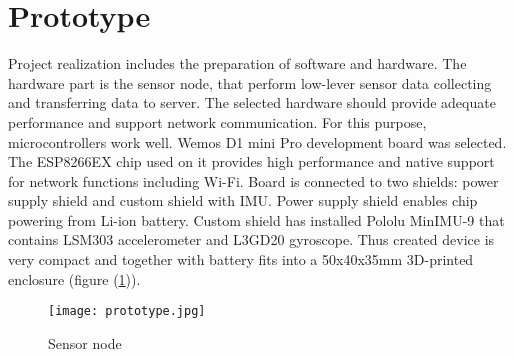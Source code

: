 \section{Prototype}
Project realization includes the preparation of software and hardware. The hardware part is the sensor node, that perform low-lever sensor data collecting and transferring data to server. The selected hardware should provide adequate performance and support network communication. For this purpose, microcontrollers work well. Wemos D1 mini Pro development board was selected. The ESP8266EX chip used on it provides high performance and native support for network functions including Wi-Fi. Board is connected to two shields: power supply shield and custom shield with IMU. Power supply shield enables chip powering from Li-ion battery. Custom shield has installed Pololu MinIMU-9 that contains LSM303 accelerometer and L3GD20 gyroscope. Thus created device is very compact and together with battery fits into a 50x40x35mm 3D-printed enclosure (figure (\ref{prototype})).

\begin{figure}[!h]
	\begin{center}
		\texttt{[image: prototype.jpg]}
	\end{center}
	\caption{Sensor node}
	\label{prototype}
\end{figure}

